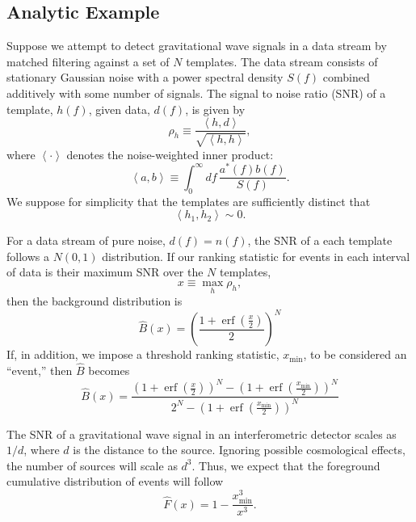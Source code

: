 \documentclass[aps,prd,reprint]{revtex4-1}
\newcommand{\xmin}{x_\mathrm{min}}
\DeclareMathOperator{\erf}{erf}
\begin{document}
\subsection{Analytic Example}
\label{sec:analytic-GW-example}

Suppose we attempt to detect gravitational wave signals in a data
stream by matched filtering against a set of $N$ templates.  The data
stream consists of stationary Gaussian noise with a power spectral
density $S(f)$ combined additively with some number of signals.  The
signal to noise ratio (SNR) of a template, $h(f)$, given data, $d(f)$,
is given by
\begin{equation}
  \rho_h \equiv \frac{\left\langle h, d \right\rangle}{\sqrt{\left
        \langle h, h \right\rangle}},
\end{equation}
where $\left \langle \cdot \right\rangle$ denotes the noise-weighted
inner product:
\begin{equation}
  \left\langle a, b \right\rangle \equiv \int_0^\infty df\,
  \frac{a^*(f) b(f)}{S(f)}.
\end{equation}
We suppose for simplicity that the templates are sufficiently distinct
that 
\begin{equation}
  \left\langle h_1, h_2 \right\rangle \sim 0.
\end{equation}

For a data stream of pure noise, $d(f) = n(f)$, the SNR of a each
template follows a $N(0,1)$ distribution.  If our ranking statistic
for events in each interval of data is their maximum SNR over the $N$
templates, 
\begin{equation}
  x \equiv \max_h \rho_h,
\end{equation}
then the background distribution is
\begin{equation}
  \hat{B}(x) = \left( \frac{1 + \erf\left( \frac{x}{2}
      \right)}{2} \right)^N
\end{equation}
If, in addition, we impose a threshold ranking statistic, $\xmin$, to
be considered an ``event,'' then $\hat{B}$ becomes
\begin{equation}
  \label{eq:analytic-background-rate}
  \hat{B}(x) = \frac{\left( 1 + \erf\left( \frac{x}{2} \right)
    \right)^N - \left( 1 + \erf\left( \frac{\xmin}{2} \right)
    \right)^N}{2^N - \left( 1 + \erf\left( \frac{\xmin}{2} \right)
    \right)^N }
\end{equation}

The SNR of a gravitational wave signal in an interferometric detector
scales as $1/d$, where $d$ is the distance to the source.  Ignoring
possible cosmological effects, the number of sources will scale as
$d^3$.  Thus, we expect that the foreground cumulative distribution of
events will follow
\begin{equation}
  \label{eq:analytic-foreground-rate}
  \hat{F}(x) = 1 - \frac{\xmin^3}{x^3}.
\end{equation}
\end{document}
